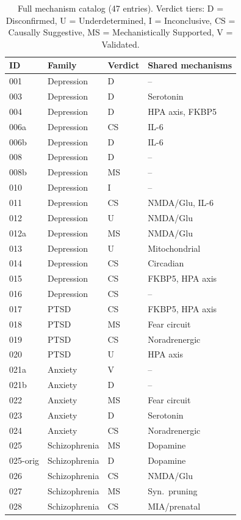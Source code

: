 \documentclass[11pt]{article}
\begin{document}
\begin{table}[h]
\centering
\caption{Full mechanism catalog (47 entries). Verdict tiers: D = Disconfirmed, U = Underdetermined, I = Inconclusive, CS = Causally Suggestive, MS = Mechanistically Supported, V = Validated.}
\label{tab:catalog}
\footnotesize
\begin{tabular}{llll}
\toprule
ID & Family & Verdict & Shared mechanisms \\
\midrule
001 & Depression & D & -- \\
003 & Depression & D & Serotonin \\
004 & Depression & D & HPA axis, FKBP5 \\
006a & Depression & CS & IL-6 \\
006b & Depression & D & IL-6 \\
008 & Depression & D & -- \\
008b & Depression & MS & -- \\
010 & Depression & I & -- \\
011 & Depression & CS & NMDA/Glu, IL-6 \\
012 & Depression & U & NMDA/Glu \\
012a & Depression & MS & NMDA/Glu \\
013 & Depression & U & Mitochondrial \\
014 & Depression & CS & Circadian \\
015 & Depression & CS & FKBP5, HPA axis \\
016 & Depression & CS & -- \\
\midrule
017 & PTSD & CS & FKBP5, HPA axis \\
018 & PTSD & MS & Fear circuit \\
019 & PTSD & CS & Noradrenergic \\
020 & PTSD & U & HPA axis \\
\midrule
021a & Anxiety & V & -- \\
021b & Anxiety & D & -- \\
022 & Anxiety & MS & Fear circuit \\
023 & Anxiety & D & Serotonin \\
024 & Anxiety & CS & Noradrenergic \\
\midrule
025 & Schizophrenia & MS & Dopamine \\
025-orig & Schizophrenia & D & Dopamine \\
026 & Schizophrenia & CS & NMDA/Glu \\
027 & Schizophrenia & MS & Syn.\ pruning \\
028 & Schizophrenia & CS & MIA/prenatal \\

\end{tabular}
\end{table}
\end{document}
